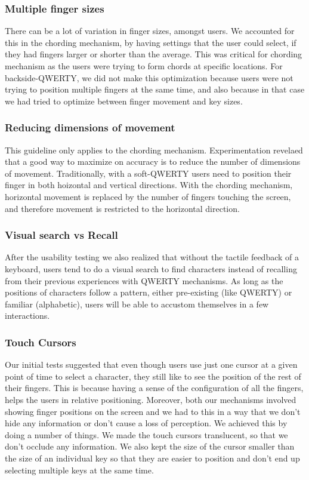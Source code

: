 \subsubsection{Multiple finger sizes}

There can be a lot of variation in finger sizes, amongst users. We accounted for this in the chording mechanism, by having settings that the user could select, if they had fingers larger or shorter than the average. This was critical for chording mechanism as the users were trying to form chords at specific locations. For backside-QWERTY, we did not make this optimization because users were not trying to position multiple fingers at the same time, and also because in that case we had tried to optimize between finger movement and key sizes.

\subsubsection{Reducing dimensions of movement}

This guideline only applies to the chording mechanism.
Experimentation revelaed that a good way to maximize on accuracy is to
reduce the number of dimensions of movement. Traditionally, with a
soft-QWERTY users need to position their finger in both hoizontal and
vertical directions. With the chording mechanism, horizontal movement
is replaced by the number of fingers touching the screen, and
therefore movement is restricted to the horizontal direction.

\subsubsection{Visual search vs Recall}

After the usability testing we also realized that without the tactile
feedback of a keyboard, users tend to do a visual search to find
characters instead of recalling from their previous experiences with
QWERTY mechanisms. As long as the positions of characters follow a
pattern, either pre-existing (like QWERTY) or familiar (alphabetic),
users will be able to accustom themselves in a few interactions.

\subsubsection{Touch Cursors}

Our initial tests suggested that even though users use just one cursor at a given point of time to select a character, they still like to see the position of the rest of their fingers. This is because having a sense of the configuration of all the fingers, helps the users in relative positioning. Moreover, both our mechanisms involved showing finger positions on the screen and we had to this in a way that we don't hide any information or don't cause a loss of perception. We achieved this by doing a number of things. We made the touch cursors translucent, so that we don't occlude any information. We also kept the size of the cursor smaller than the size of an individual key so that they are easier to position and don't end up selecting multiple keys at the same time. 